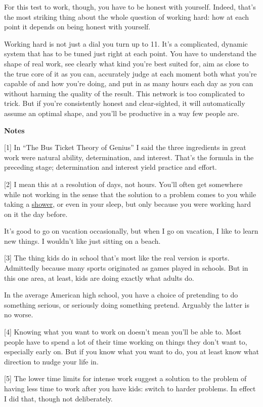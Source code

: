 For this test to work, though, you have to be honest with yourself.
Indeed, that's the most striking thing about the whole question of
working hard: how at each point it depends on being honest with
yourself.

Working hard is not just a dial you turn up to 11. It's a complicated,
dynamic system that has to be tuned just right at each point. You have
to understand the shape of real work, see clearly what kind you're best
suited for, aim as close to the true core of it as you can, accurately
judge at each moment both what you're capable of and how you're doing,
and put in as many hours each day as you can without harming the quality
of the result. This network is too complicated to trick. But if you're
consistently honest and clear-sighted, it will automatically assume an
optimal shape, and you'll be productive in a way few people are.

\textbf{Notes}

{[}1{]} In ``The Bus Ticket Theory of Genius'' I said the three
ingredients in great work were natural ability, determination, and
interest. That's the formula in the preceding stage; determination and
interest yield practice and effort.

{[}2{]} I mean this at a resolution of days, not hours. You'll often get
somewhere while not working in the sense that the solution to a problem
comes to you while taking a \href{top.html}{shower}, or even in your
sleep, but only because you were working hard on it the day before.

It's good to go on vacation occasionally, but when I go on vacation, I
like to learn new things. I wouldn't like just sitting on a beach.

{[}3{]} The thing kids do in school that's most like the real version is
sports. Admittedly because many sports originated as games played in
schools. But in this one area, at least, kids are doing exactly what
adults do.

In the average American high school, you have a choice of pretending to
do something serious, or seriously doing something pretend. Arguably the
latter is no worse.

{[}4{]} Knowing what you want to work on doesn't mean you'll be able to.
Most people have to spend a lot of their time working on things they
don't want to, especially early on. But if you know what you want to do,
you at least know what direction to nudge your life in.

{[}5{]} The lower time limits for intense work suggest a solution to the
problem of having less time to work after you have kids: switch to
harder problems. In effect I did that, though not deliberately.

